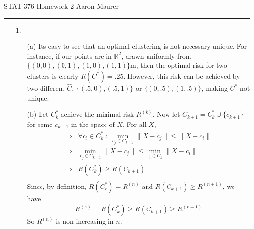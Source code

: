 \documentclass[11pt]{article}
\newcommand{\R}{\mathbb{R}}
\theoremstyle{definition}
\begin{document}
STAT 376 Homework 2 \hfill Aaron Maurer
\vspace{2mm}
\hrule
\vspace{2mm}

\begin{itemize}
    \item[1.]
        \begin{itemize}
            \item[(a)]
                Its easy to see that an optimal clustering is not necessary unique. For instance, if our points are in $\R^2$, drawn uniformly from $\{(0,0),(0,1),(1,0),(1,1)\}$m, then the optimal risk for two clusters is clearly $R(C^*)=.25$. However, this risk can be achieved by two different $\hat C$, \(\{(.5,0),(.5,1)\}\) or \(\{(0,.5),(1,.5)\}\), making $C^*$ not unique.
            \item[(b)]
                Let $C^*_{k}$ achieve the minimal risk $R^{(k)}$. Now let $C_{k+1}=C^*_{k}\cup\{c_{k+1}\}$ for some \(c_{k+1}\) in the space of $X$. For all $X$, 
                \begin{align*}
                    \Rightarrow& \forall c_i \in C_k^*\; :\; \min_{c_j\in C_{k+1}}\|X-c_j\| \leq \|X-c_i\|  \\
                    \Rightarrow& \min_{c_j\in C_{k+1}}\|X-c_j\| \leq \min_{c_i\in C_{k}} \|X-c_i\|  \\
                    \Rightarrow& R(C^*_{k}) \geq R(C_{k+1})  \\
                \end{align*}
                Since, by definition, \(R(C^*_{k}) =R^{(n)}\) and \(R(C_{k+1}) \geq R^{(n+1)}\), we have
                \[R^{(n)} = R(C^*_{k}) \geq R(C_{k+1}) \geq R^{(n+1)}\]
                So $R^{(n)}$ is non increasing in $n$.

        \end{itemize}
\end{itemize}
\end{document}
